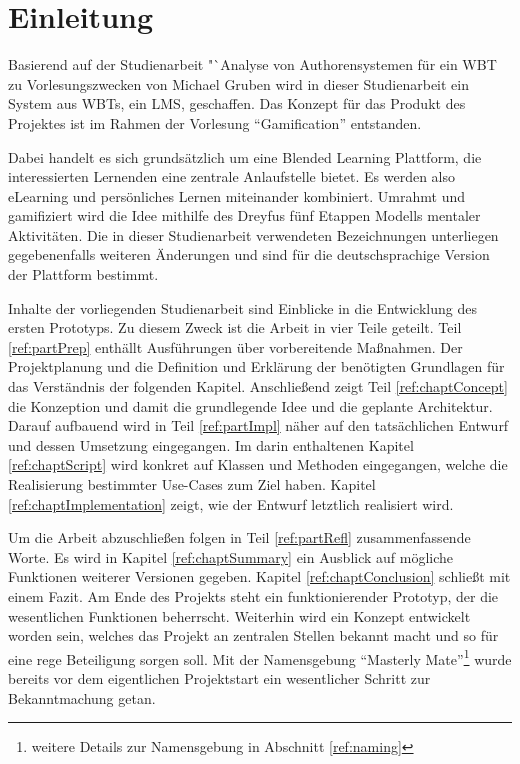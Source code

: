 \chapter{Einleitung}\label{ref:chaptIntroduction}
Basierend auf der Studienarbeit "`Analyse von Authorensystemen für ein WBT zu
Vorlesungszwecken von Michael Gruben \cite{gruben:2012} wird in dieser
Studienarbeit ein System aus \ac{WBT}s, ein \ac{LMS}, geschaffen. Das Konzept
für das Produkt des Projektes ist im Rahmen der Vorlesung "`Gamification"' entstanden.

Dabei handelt es sich grundsätzlich um eine Blended Learning Plattform, die
interessierten Lernenden eine zentrale Anlaufstelle bietet. Es werden also
eLearning und persönliches Lernen miteinander kombiniert. Umrahmt und
gamifiziert wird die Idee mithilfe des Dreyfus fünf Etappen Modells mentaler
Aktivitäten. Die in dieser Studienarbeit verwendeten Bezeichnungen unterliegen
gegebenenfalls weiteren Änderungen und sind für die deutschsprachige Version der
Plattform bestimmt.

Inhalte der vorliegenden Studienarbeit sind Einblicke in die Entwicklung des
ersten Prototyps. Zu diesem Zweck ist die Arbeit in vier Teile geteilt. Teil
\ref{ref:partPrep} enthällt Ausführungen über vorbereitende Maßnahmen. Der
Projektplanung und die Definition und Erklärung der benötigten Grundlagen für
das Verständnis der folgenden Kapitel. Anschließend zeigt Teil
\ref{ref:chaptConcept} die Konzeption und damit die grundlegende Idee und die
geplante Architektur. Darauf aufbauend wird in Teil \ref{ref:partImpl} näher auf
den tatsächlichen Entwurf und dessen Umsetzung eingegangen.
Im darin enthaltenen Kapitel \ref{ref:chaptScript} wird konkret auf Klassen und
Methoden eingegangen, welche die Realisierung bestimmter Use-Cases zum Ziel haben.
Kapitel \ref{ref:chaptImplementation} zeigt, wie der Entwurf letztlich
realisiert wird. 

Um die Arbeit abzuschließen folgen in Teil \ref{ref:partRefl}
zusammenfassende Worte. Es wird in Kapitel \ref{ref:chaptSummary} ein Ausblick
auf mögliche Funktionen weiterer Versionen gegeben. Kapitel
\ref{ref:chaptConclusion} schließt mit einem Fazit.
\newpage
Am Ende des Projekts steht ein funktionierender Prototyp, der die wesentlichen
Funktionen beherrscht. Weiterhin wird ein Konzept entwickelt worden sein,
welches das Projekt an zentralen Stellen bekannt macht und so für eine rege
Beteiligung sorgen soll. Mit der Namensgebung "`Masterly Mate"'\footnote{weitere
Details zur Namensgebung in Abschnitt \ref{ref:naming}} wurde bereits vor dem
eigentlichen Projektstart ein wesentlicher Schritt zur Bekanntmachung getan.